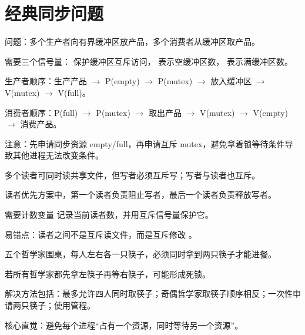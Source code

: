 \section{经典同步问题}
\begin{points}
  \item 问题：多个生产者向有界缓冲区放产品，多个消费者从缓冲区取产品。
  \item 需要三个信号量： 保护缓冲区互斥访问， 表示空缓冲区数， 表示满缓冲区数。
  \item 生产者顺序：生产产品 $\rightarrow$ P(empty) $\rightarrow$ P(mutex) $\rightarrow$ 放入缓冲区 $\rightarrow$ V(mutex) $\rightarrow$ V(full)。
  \item 消费者顺序：P(full) $\rightarrow$ P(mutex) $\rightarrow$ 取出产品 $\rightarrow$ V(mutex) $\rightarrow$ V(empty) $\rightarrow$ 消费产品。
  \item 注意：先申请同步资源 empty/full，再申请互斥 mutex，避免拿着锁等待条件导致其他进程无法改变条件。
\end{points}


\begin{points}
  \item 多个读者可同时读共享文件，但写者必须互斥写；写者与读者也互斥。
  \item 读者优先方案中，第一个读者负责阻止写者，最后一个读者负责释放写者。
  \item 需要计数变量  记录当前读者数，并用互斥信号量保护它。
  \item 易错点：读者之间不是互斥读文件，而是互斥修改 。
\end{points}


\begin{points}
  \item 五个哲学家围桌，每人左右各一只筷子，必须同时拿到两只筷子才能进餐。
  \item 若所有哲学家都先拿左筷子再等右筷子，可能形成死锁。
  \item 解决方法包括：最多允许四人同时取筷子；奇偶哲学家取筷子顺序相反；一次性申请两只筷子；使用管程。
  \item 核心直觉：避免每个进程“占有一个资源，同时等待另一个资源”。
\end{points}


